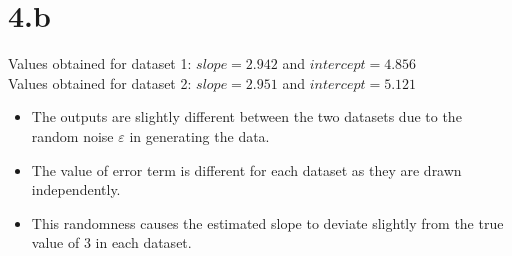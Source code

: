 \documentclass[12pt]{article}
\begin{document}
\section*{4.b}
Values obtained for dataset 1: \(slope = 2.942\) and \(intercept = 4.856\)
\\
Values obtained for dataset 2: \(slope = 2.951\) and \(intercept = 5.121\)
\\
\begin{itemize}
    \item The outputs are slightly different between the two datasets due to
    the random noise \(\varepsilon\) in generating the data.
    \item The value of error term is different for each dataset as they are
    drawn independently.
    \item This randomness causes the estimated slope to deviate slightly from
    the true value of 3 in each dataset.
\end{itemize}

\newpage
\end{document}

